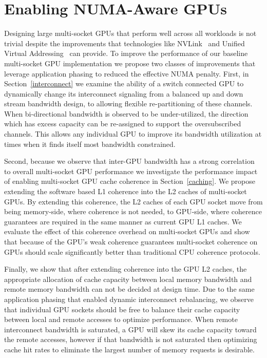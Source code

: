 \section{Enabling NUMA-Aware GPUs}

Designing large multi-socket GPUs that 
perform well across all workloads is not trivial despite the 
improvements that technologies like NVLink~\cite{NVLINK} and Unified Virtual 
Addressing~\cite{UVM} can provide. To improve the performance of our baseline 
multi-socket GPU implementation we 
propose two classes of improvements that leverage application phasing to reduced 
the effective NUMA penalty.  First, in 
Section~\ref{interconnect} we examine the ability of a switch connected GPU to 
dynamically change its interconnect signaling from a balanced up and down 
stream bandwidth design, to allowing flexible re-partitioning of these channels.  
When bi-directional bandwidth is observed to be under-utilized, the direction 
which has excess capacity can be re-assigned to support the oversubscribed 
channels. This allows any individual GPU to improve its bandwidth utilization at 
times when it finds itself most bandwidth constrained.

Second, because we observe that inter-GPU bandwidth has a strong correlation to 
overall multi-socket GPU performance we investigate the performance impact of 
enabling multi-socket GPU cache coherence in Section~\ref{caching}.  We propose 
extending the software based L1 coherence into the L2 caches of multi-socket 
GPUs.  By extending this coherence, the L2 caches of each GPU socket move from 
being memory-side, where coherence is not needed, to GPU-side, where coherence 
guarantees are required in the same manner as current GPU L1 caches.  We 
evaluate the effect of this coherence overhead on multi-socket GPUs and show 
that because of the GPU's weak coherence guarantees multi-socket coherence on 
GPUs should scale significantly better than traditional CPU coherence protocols.

Finally, we show that after extending coherence into the GPU L2 caches, the 
appropriate allocation of cache capacity between local memory bandwidth and 
remote memory bandwidth can not be decided at design time.  Due to the same 
application phasing that enabled dynamic interconnect rebalancing, we observe 
that individual GPU sockets should be free to balance their cache capacity 
between local and remote accesses to optimize performance.  When remote 
interconnect bandwidth is saturated, a GPU will skew its cache capacity toward 
the remote accesses,  however if that bandwidth is not saturated then optimizing 
cache hit rates to eliminate the largest number of memory requests is 
desirable.

